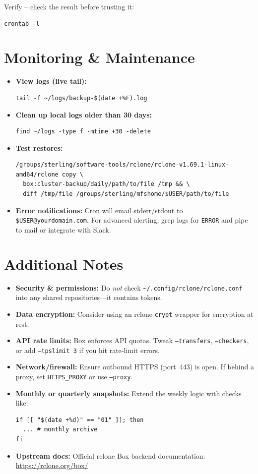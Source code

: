 \documentclass[12pt,letterpaper]{article}
\begin{document}
Verify -- check the result before trusting it:
\begin{lstlisting}[style=custombash]
crontab -l
\end{lstlisting}

\section{Monitoring \& Maintenance}
\begin{itemize}
  \item \textbf{View logs (live tail):}
    \begin{lstlisting}[style=custombash]
tail -f ~/logs/backup-$(date +%F).log
    \end{lstlisting}
  \item \textbf{Clean up local logs older than 30 days:}
    \begin{lstlisting}[style=custombash]
find ~/logs -type f -mtime +30 -delete
    \end{lstlisting}
  \item \textbf{Test restores:}
    \begin{lstlisting}[style=custombash]
/groups/sterling/software-tools/rclone/rclone-v1.69.1-linux-amd64/rclone copy \
  box:cluster-backup/daily/path/to/file /tmp && \
  diff /tmp/file /groups/sterling/mfshome/$USER/path/to/file
    \end{lstlisting}
  \item \textbf{Error notifications:} Cron will email stderr/stdout to \verb|$USER@yourdomain.com|. For advanced alerting, grep logs for \texttt{ERROR} and pipe to mail or integrate with Slack.
\end{itemize}

\section{Additional Notes}
\begin{itemize}
  \item \textbf{Security \& permissions:}
    Do \emph{not} check \verb|~/.config/rclone/rclone.conf| into any shared repositories—it contains tokens.
  \item \textbf{Data encryption:}
    Consider using an rclone \texttt{crypt} wrapper for encryption at rest.
  \item \textbf{API rate limits:}
    Box enforces API quotas. Tweak \texttt{--transfers}, \texttt{--checkers}, or add \texttt{--tpslimit 3} if you hit rate-limit errors.
  \item \textbf{Network/firewall:}
    Ensure outbound HTTPS (port~443) is open. If behind a proxy, set \verb|HTTPS_PROXY| or use \texttt{--proxy}.
  \item \textbf{Monthly or quarterly snapshots:}
    Extend the weekly logic with checks like:
    \begin{lstlisting}[style=custombash]
if [[ "$(date +%d)" == "01" ]]; then
  ... # monthly archive
fi
    \end{lstlisting}
  \item \textbf{Upstream docs:}
    Official rclone Box backend documentation:
    \href{https://rclone.org/box/}{https://rclone.org/box/}
\end{itemize}
\end{document}
